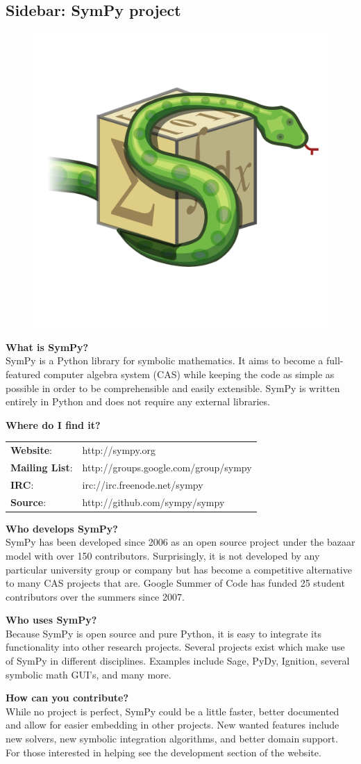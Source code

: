 \subsection{Sidebar: SymPy project}
\begin{figure}[h]
\vspace{-0pt}
\centering
\includegraphics[width=.18\textwidth]{images/logo}
\vspace{-0pt}
\label{fig:}
\vspace{00pt}
\end{figure}

\begin{description}
\item {\bf What is SymPy?}\\
SymPy is a Python library for symbolic mathematics.
It aims to become a
full-featured computer algebra system (CAS) while keeping the code as simple as
possible in order to be comprehensible and easily extensible. SymPy is written
entirely in Python and does not require any external libraries.
\item{\bf Where do I find it?}\\
\begin{tabular}{ll}
{\bf Website}: & http://sympy.org \\
{\bf Mailing List}: & http://groups.google.com/group/sympy \\
{\bf IRC}: & irc://irc.freenode.net/sympy \\
{\bf Source}: & http://github.com/sympy/sympy
\end{tabular}
\item {\bf Who develops SymPy?}\\
SymPy has been developed since 2006 as an open source project under the bazaar
model with over 150 contributors.  Surprisingly, it is not developed by any
particular university group or company but has become a competitive alternative
to many CAS projects that are.  Google Summer of Code has funded 25
student contributors over the summers since 2007.
\item{\bf Who uses SymPy?}\\
Because SymPy is open source and pure Python, it is easy to integrate its
functionality into other research projects. Several projects exist which make
use of SymPy in different disciplines. Examples include Sage, PyDy, Ignition,
several symbolic math GUI's, and many more.
\item{\bf How can you contribute?}\\
While no project is perfect, SymPy could be a little faster, better documented
and allow for easier embedding in other projects.  New wanted features
include new solvers, new symbolic integration algorithms, and better domain
support.  For those interested in helping see the development section of the
website.
\end{description}
